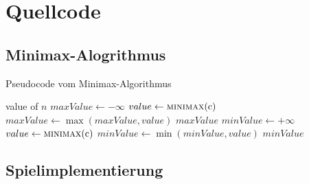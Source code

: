 \chapter{Quellcode}
\label{anhang:chapter-quellcode}



\section{Minimax-Alogrithmus}


\begin{algorithm}
    \caption{Pseudocode vom Minimax-Algorithmus}
    \label{algo:minimax}
    \begin{algorithmic}[1]
        \State \Return value of $n$
        \State $maxValue \gets -\infty$
        \State $value \gets \Call{minimax}{$c$}$
        \State $maxValue \gets \max(maxValue, value)$
        \EndFor
        \State \Return $maxValue$
        \State $minValue \gets +\infty$
        \State $value \gets \Call{minimax}{$c$}$
        \State $minValue \gets \min(minValue, value)$
        \EndFor
        \State \Return $minValue$
        \EndIf
        \EndFunction
    \end{algorithmic}
\end{algorithm}

\pagebreak

\section{Spielimplementierung}
\label{anhang:section-quellcode-game-implementation}



\pagebreak




